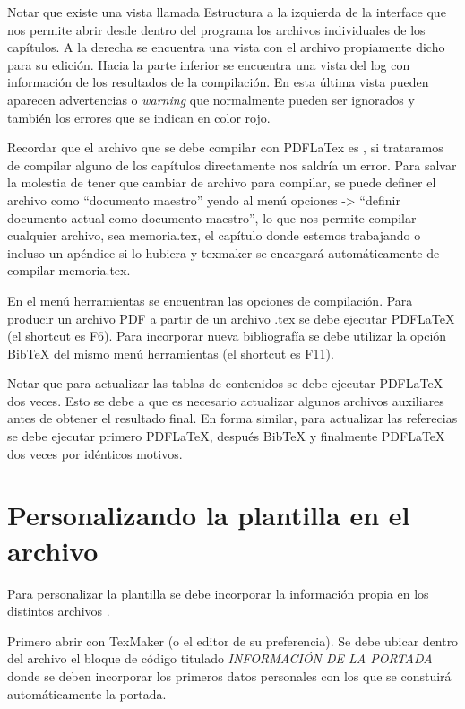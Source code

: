 Notar que existe una vista llamada Estructura a la izquierda de la interface que nos permite abrir desde dentro del programa los archivos individuales de los capítulos.  A la derecha se encuentra una vista con el archivo propiamente dicho para su edición. Hacia la parte inferior se encuentra una vista del log con información de los resultados de la compilación.  En esta última vista pueden aparecen advertencias o \textit{warning} que normalmente pueden ser ignorados y también los errores que se indican en color rojo.

Recordar que el archivo que se debe compilar con PDFLaTex es , si trataramos de compilar alguno de los capítulos directamente nos saldría un error.  Para salvar la molestia de tener que cambiar de archivo para compilar, se puede definer el archivo  como ``documento maestro'' yendo al menú opciones -> ``definir documento actual como documento maestro'', lo que nos permite compilar cualquier archivo, sea memoria.tex, el capítulo donde estemos trabajando o incluso un apéndice si lo hubiera y texmaker se encargará automáticamente de compilar memoria.tex.

En el menú herramientas se encuentran las opciones de compilación.  Para producir un archivo PDF a partir de un archivo .tex se debe ejecutar PDFLaTeX (el shortcut es F6). Para incorporar nueva bibliografía se debe utilizar la opción BibTeX del mismo menú herramientas (el shortcut es F11).

Notar que para actualizar las tablas de contenidos se debe ejecutar PDFLaTeX dos veces.  Esto se debe a que es necesario actualizar algunos archivos auxiliares antes de obtener el resultado final.  En forma similar, para actualizar las referecias se debe ejecutar primero PDFLaTeX, después BibTeX y finalmente PDFLaTeX dos veces por idénticos motivos.

\section{Personalizando la plantilla en el archivo }
\label{sec:FillingFile}

Para personalizar la plantilla se debe incorporar la información propia en los distintos archivos . 

Primero abrir  con TexMaker (o el editor de su preferencia). Se debe ubicar dentro del archivo el bloque de código titulado \emph{INFORMACIÓN DE LA PORTADA} donde se deben incorporar los primeros datos personales con los que se constuirá automáticamente la portada.


